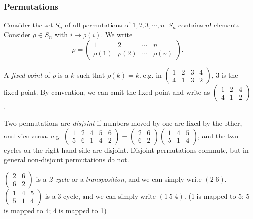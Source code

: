\documentclass[a4paper]{article}
\begin{document}
\subsubsection{Permutations}

\begin{notation}
  Consider the set $S_n$ of all permutations of $1, 2, 3, \cdots , n$. $S_n$ contains $n!$ elements. Consider $\rho\in S_n$ with $i \mapsto \rho(i)$. We write
\[
\rho = \begin{pmatrix} 1 & 2 & \cdots & n\\ \rho(1) & \rho (2) &\cdots & \rho (n)\end{pmatrix}.
\]
\end{notation}

\begin{defi}
  A \emph{fixed point} of $\rho$ is a $k$ such that $\rho(k) = k$. e.g. in $\begin{pmatrix} 1 & 2 & 3 & 4\\4 & 1 & 3 & 2\end{pmatrix}$, $3$ is the fixed point. By convention, we can omit the fixed point and write as $\begin{pmatrix} 1 & 2 & 4\\ 4 & 1 & 2\end{pmatrix}$.
\end{defi}

\begin{defi}
  Two permutations are \emph{disjoint} if numbers moved by one are fixed by the other, and vice versa.  e.g. $\begin{pmatrix} 1 & 2 & 4 & 5 & 6\\ 5 & 6 & 1 & 4 & 2\end{pmatrix} = \begin{pmatrix}2 & 6\\ 6& 2\end{pmatrix}\begin{pmatrix}1 & 4 & 5\\5 & 1 & 4\end{pmatrix}$, and the two cycles on the right hand side are disjoint. Disjoint permutations commute, but in general non-disjoint permutations do not.
\end{defi}

\begin{defi}
  $\begin{pmatrix} 2 & 6 \\ 6 & 2\end{pmatrix}$ is a \emph{2-cycle} or a \emph{transposition}, and we can simply write $(2\; 6)$. $\begin{pmatrix}1 & 4 & 5\\5 & 1 & 4\end{pmatrix}$ is a 3-cycle, and we can simply write $(1\; 5\; 4)$. (1 is mapped to 5; 5 is mapped to 4; 4 is mapped to 1)
\end{defi}
\end{document}

